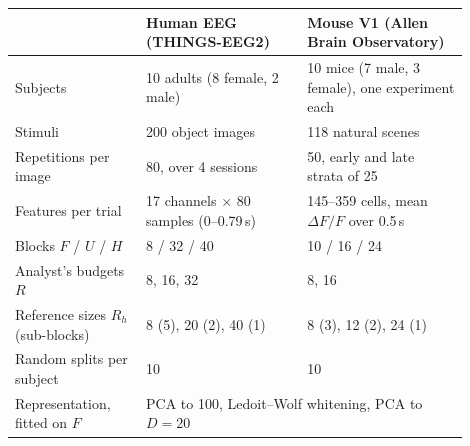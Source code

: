 \begin{tabular}{p{0.26\linewidth}p{0.32\linewidth}p{0.32\linewidth}}
\toprule
 & Human EEG (THINGS-EEG2) & Mouse V1 (Allen Brain Observatory) \\
\midrule
Subjects & 10 adults (8 female, 2 male) & 10 mice (7 male, 3 female), one experiment each \\
Stimuli & 200 object images & 118 natural scenes \\
Repetitions per image & 80, over 4 sessions & 50, early and late strata of 25 \\
Features per trial & 17 channels $\times$ 80 samples (0--0.79\,s) & 145--359 cells, mean $\Delta F/F$ over 0.5\,s \\
Blocks $F$ / $U$ / $H$ & 8 / 32 / 40 & 10 / 16 / 24 \\
Analyst's budgets $R$ & 8, 16, 32 & 8, 16 \\
Reference sizes $R_h$ (sub-blocks) & 8 (5), 20 (2), 40 (1) & 8 (3), 12 (2), 24 (1) \\
Random splits per subject & 10 & 10 \\
Representation, fitted on $F$ & \multicolumn{2}{l}{PCA to 100, Ledoit--Wolf whitening, PCA to $D=20$} \\
\bottomrule
\end{tabular}
